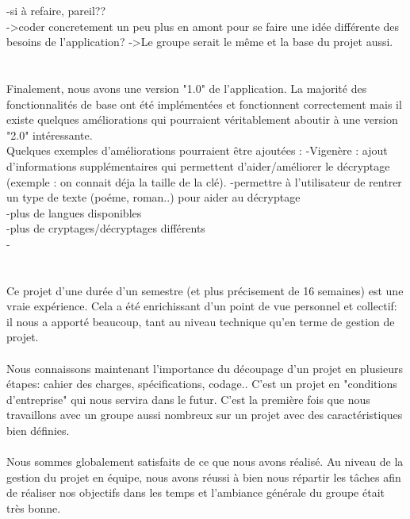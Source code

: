 \documentclass[a4]{article}
\begin{document}
	
		
	-si à refaire, pareil?? \\
	->coder concretement un peu plus en amont pour se faire une idée différente des besoins de l'application?
	->Le groupe serait le même et la base du projet aussi. \\ \\ \\
	
	
	Finalement, nous avons une version "1.0" de l’application. La majorité des fonctionnalités
de base ont été implémentées et fonctionnent correctement mais il existe quelques
améliorations qui pourraient véritablement aboutir à une version "2.0" intéressante. \\
Quelques exemples d'améliorations pourraient être ajoutées :
-Vigenère : ajout d'informations supplémentaires qui permettent d'aider/améliorer le décryptage 
(exemple : on connait déja la taille de la clé).
-permettre à l'utilisateur de rentrer un type de texte (poéme, roman..) pour aider au décryptage \\
-plus de langues disponibles \\
-plus de cryptages/décryptages différents \\

-\\ \\ \\

	
	
Ce projet d'une durée d'un semestre (et plus précisement de 16 semaines) est une vraie expérience.
Cela a été enrichissant d'un point de vue personnel et collectif:
il nous a apporté beaucoup, tant au
niveau technique qu’en terme de gestion de projet.  \\  \\
Nous connaissons maintenant l'importance du découpage d'un projet en plusieurs étapes: cahier des charges, spécifications, codage..
C'est un projet en "conditions d'entreprise" qui nous servira dans le futur.
C’est la première fois que nous travaillons avec un groupe aussi nombreux sur un projet avec des caractéristiques bien définies. \\ \\
Nous sommes globalement satisfaits de ce que nous avons réalisé.
Au niveau de la gestion du projet en équipe, nous avons réussi à bien nous répartir les
tâches afin de réaliser nos objectifs dans les temps et l'ambiance générale du groupe était très bonne. \\ \\ \\


	
\end{document}

